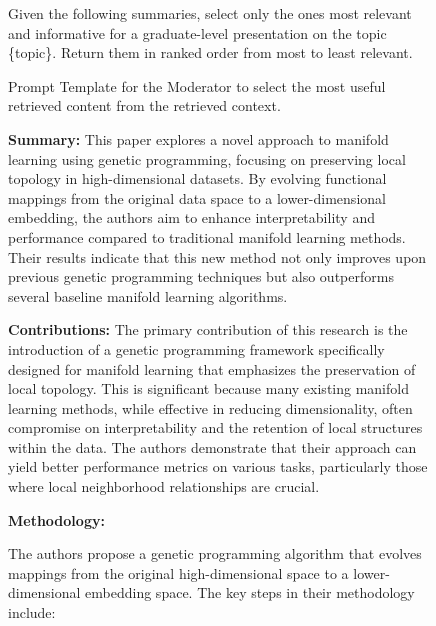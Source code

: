 \documentclass[letterpaper]{article} %
\begin{document}
\begin{figure}
\begin{tcolorbox}[colback=gray!10,colframe=black!90,title=Moderator: Source Selection Prompt Template.]

Given the following summaries, select only the ones most relevant and informative for a graduate-level presentation on the topic \{topic\}. 
Return them in ranked order from most to least relevant.

\end{tcolorbox}
\caption{Prompt Template for the Moderator to select the most useful retrieved content from the retrieved context. }
\label{fig:mod_select_prompt}
\end{figure}



\begin{figure}
\begin{tcolorbox}[colback=gray!10,colframe=blue!70,title=Retriever Agent Case Study ,fonttitle=\bfseries]

\textbf{Summary:} This paper explores a novel approach to manifold learning using genetic programming, focusing on preserving local topology in high-dimensional datasets. By evolving functional mappings from the original data space to a lower-dimensional embedding, the authors aim to enhance interpretability and performance compared to traditional manifold learning methods. Their results indicate that this new method not only improves upon previous genetic programming techniques but also outperforms several baseline manifold learning algorithms.


\textbf{Contributions:}
The primary contribution of this research is the introduction of a genetic programming framework specifically designed for manifold learning that emphasizes the preservation of local topology. This is significant because many existing manifold learning methods, while effective in reducing dimensionality, often compromise on interpretability and the retention of local structures within the data. The authors demonstrate that their approach can yield better performance metrics on various tasks, particularly those where local neighborhood relationships are crucial.

\textbf{Methodology:}

The authors propose a genetic programming algorithm that evolves mappings from the original high-dimensional space to a lower-dimensional embedding space. The key steps in their methodology include:

\begin{itemize}
    

\end{itemize}
\end{tcolorbox}
\end{figure}
\end{document}
